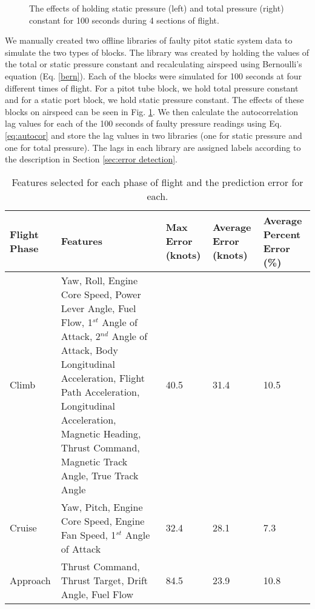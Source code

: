 \documentclass[]{aiaa-tc}
\begin{document}
\begin{figure}[h!]
 \begin{subfigmatrix}{2}%
 \end{subfigmatrix}
 \caption{The effects of holding static pressure (left) and total pressure (right) constant for 100 seconds during 4 sections of flight.}
 \label{fig:airspeeds}
\end{figure}


We manually created two offline libraries of faulty pitot static system data to simulate the two types of blocks. The library was created by holding the values of the total or static pressure constant and recalculating airspeed using Bernoulli's equation (Eq. \ref{bern}). Each of the blocks were simulated for 100 seconds at four different times of flight. For a pitot tube block, we hold total pressure constant and for a static port block, we hold static pressure constant. The effects of these blocks on airspeed can be seen in Fig. \ref{fig:airspeeds}. We then calculate the autocorrelation lag values for each of the 100 seconds of faulty pressure readings using Eq. \ref{eq:autocor} and store the lag values in two libraries (one for static pressure and one for total pressure). The lags in each library are assigned labels according to the description in Section \ref{sec:error detection}. 


\begin{table}[h!]
\caption{\label{table:feat}Features selected for each phase of flight and the prediction error for each.}
\begin{tabular}{|L{4.5em}|L{25em}|L{4em}|L{4em}| L{4.5em}|} 
   \hline
 Flight Phase & Features & Max Error (knots) & Average Error (knots) & Average Percent Error (\%)\\ 
\hline\hline
 Climb & Yaw, Roll, Engine Core Speed, Power Lever Angle, Fuel Flow, 1$^{st}$ Angle of Attack, 2$^{nd}$ Angle of Attack, Body Longitudinal Acceleration, Flight Path Acceleration, Longitudinal Acceleration, Magnetic Heading, Thrust Command, Magnetic Track Angle, True Track Angle& 40.5 & 31.4 & 10.5\\ \hline

Cruise & Yaw, Pitch, Engine Core Speed, Engine Fan Speed, 1$^{st}$ Angle of Attack & 32.4 & 28.1& 7.3
\\\hline
Approach & Thrust Command, Thrust Target, Drift Angle, Fuel Flow & 84.5 & 23.9 & 10.8\\
\hline
\end{tabular}
\end{table}
\end{document}
